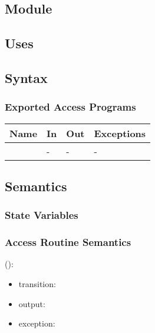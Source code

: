 \documentclass[12pt, titlepage]{article}
\begin{document}
\subsection{Module}


\subsection{Uses}


\subsection{Syntax}

\subsubsection{Exported Access Programs}

\begin{center}
	\begin{tabular}{p{3cm} p{4cm} p{4cm} p{2cm}}
		\hline
		\textbf{Name} & \textbf{In} & \textbf{Out} & \textbf{Exceptions} \\
		\hline
		\wss{accessProg} & - & - & - \\
		\hline
	\end{tabular}
\end{center}

\subsection{Semantics}

\subsubsection{State Variables}


\subsubsection{Access Routine Semantics}

\noindent {}():
\begin{itemize}
	\item transition:  
	\item output:  
	\item exception:  
\end{itemize}

\newpage
\end{document}
